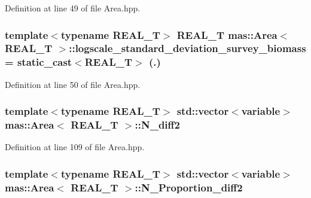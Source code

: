 Definition at line 49 of file Area.\-hpp.

\hypertarget{structmas_1_1_area_aa2ea154a326396d16d67ae84d39ccb3b}{
\subsubsection[{logscale\-\_\-standard\-\_\-deviation\-\_\-survey\-\_\-biomass}]{\setlength{\rightskip}{0pt plus 5cm}template$<$typename R\-E\-A\-L\-\_\-\-T$>$ R\-E\-A\-L\-\_\-\-T {\bf mas\-::\-Area}$<$ R\-E\-A\-L\-\_\-\-T $>$\-::logscale\-\_\-standard\-\_\-deviation\-\_\-survey\-\_\-biomass = static\-\_\-cast$<$R\-E\-A\-L\-\_\-\-T$>$ (.)}}\label{structmas_1_1_area_aa2ea154a326396d16d67ae84d39ccb3b}


Definition at line 50 of file Area.\-hpp.

\hypertarget{structmas_1_1_area_a3489f1ad9f89aa85559a05457afb40c5}{
\subsubsection[{N\-\_\-diff2}]{\setlength{\rightskip}{0pt plus 5cm}template$<$typename R\-E\-A\-L\-\_\-\-T$>$ std\-::vector$<${\bf variable}$>$ {\bf mas\-::\-Area}$<$ R\-E\-A\-L\-\_\-\-T $>$\-::N\-\_\-diff2}}\label{structmas_1_1_area_a3489f1ad9f89aa85559a05457afb40c5}


Definition at line 109 of file Area.\-hpp.

\hypertarget{structmas_1_1_area_aed10a818480665caf15bb1c8ad84150d}{
\subsubsection[{N\-\_\-\-Proportion\-\_\-diff2}]{\setlength{\rightskip}{0pt plus 5cm}template$<$typename R\-E\-A\-L\-\_\-\-T$>$ std\-::vector$<${\bf variable}$>$ {\bf mas\-::\-Area}$<$ R\-E\-A\-L\-\_\-\-T $>$\-::N\-\_\-\-Proportion\-\_\-diff2}}\label{structmas_1_1_area_aed10a818480665caf15bb1c8ad84150d}



